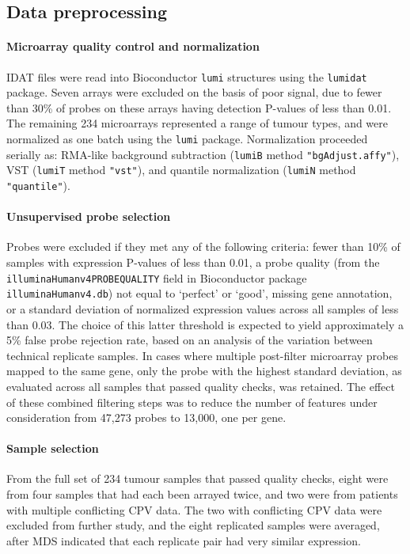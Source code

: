 \documentclass[dissertation.tex]{subfiles}
\begin{document}
\subsection{Data preprocessing}
\paragraph{Microarray quality control and normalization}
\gls{IDAT} files were read into Bioconductor \texttt{lumi} structures using the \texttt{lumidat} package.  Seven arrays were excluded on the basis of poor signal, due to fewer than 30\% of probes on these arrays having detection P-values of less than 0.01.  The remaining 234 microarrays represented a range of tumour types, and were normalized as one batch using the \texttt{lumi} package.  Normalization proceeded serially as: RMA-like background subtraction (\texttt{lumiB} method \texttt{"bgAdjust.affy"}), \gls{VST} (\texttt{lumiT} method \texttt{"vst"}), and quantile normalization (\texttt{lumiN} method \texttt{"quantile"}).

\paragraph{Unsupervised probe selection}
Probes were excluded if they met any of the following criteria: fewer than 10\% of samples with expression P-values of less than 0.01, a probe quality (from the \texttt{illuminaHumanv4PROBEQUALITY} field in Bioconductor package \texttt{illuminaHumanv4.db}) not equal to `perfect' or `good', missing gene annotation, or a standard deviation of normalized expression values across all samples of less than 0.03.  The choice of this latter threshold is expected to yield approximately a 5\% false probe rejection rate, based on an analysis of the variation between technical replicate samples.  In cases where multiple post-filter microarray probes mapped to the same gene, only the probe with the highest standard deviation, as evaluated across all samples that passed quality checks, was retained.  The effect of these combined filtering steps was to reduce the number of features under consideration from 47,273 probes to 13,000, one per gene.

\paragraph{Sample selection}  From the full set of 234 tumour samples that passed quality checks, eight were from four samples that had each been arrayed twice, and two were from patients with multiple conflicting \gls{CPV} data.  The two with conflicting \gls{CPV} data were excluded from further study, and the eight replicated samples were averaged, after \gls{MDS} indicated that each replicate pair had very similar expression.
\end{document}
